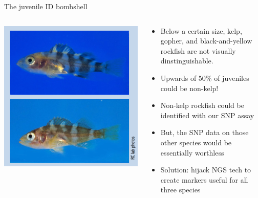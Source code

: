 \documentclass[letter,graphicx]{beamer}
\begin{document}
\begin{frame}{The juvenile ID bombshell}
\begin{columns}
\begin{column}{.38\textwidth}
\includegraphics[width=\textwidth]{./figs/juvie_rockfish.png}
\end{column}
\begin{column}{.55\textwidth}
\begin{itemize}
\item Below a certain size, kelp, gopher, and black-and-yellow rockfish are not visually dinstinguishable.
\item Upwards of 50\% of juveniles could be non-kelp!
\item Non-kelp rockfish could be identified with our SNP assay
\item But, the SNP data on those other species would be essentially worthless
\item Solution: hijack NGS tech to create markers useful for all three species
\end{itemize}


\end{column}

\end{columns}

\end{frame}
\end{document}
